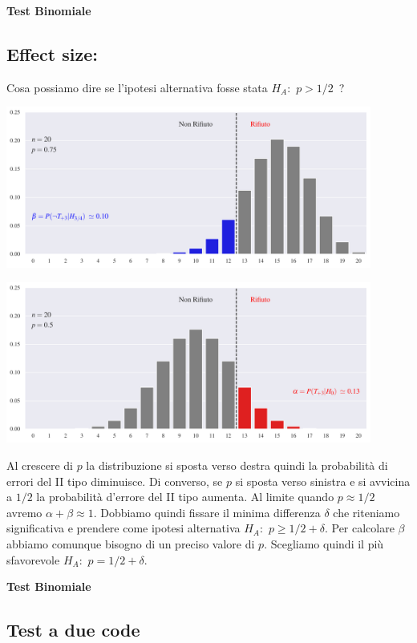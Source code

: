 \documentclass[11pt,openany]{book}
\begin{document}
\clearpage\hfill\textbf{Test Binomiale}\subsection{Effect size: \boldmath{$\delta$}}


Cosa possiamo dire se l'ipotesi alternativa fosse stata $H_A:$ $p>1/2$~?

\hfil\includegraphics[width=0.9\textwidth]{figure/B-test_02.pdf}

\hfil\includegraphics[width=0.9\textwidth]{figure/B-test_01.pdf}

Al crescere di $p$ la distribuzione si sposta verso destra quindi la probabilità di errori del II tipo diminuisce. 
Di converso, se $p$ si sposta verso sinistra e si avvicina a $1/2$  la probabilità d'errore del II tipo aumenta. Al limite quando $p\approx 1/2$ avremo $\alpha+\beta\approx 1$. 
Dobbiamo quindi fissare il minima differenza $\delta$ che riteniamo significativa e prendere come ipotesi alternativa  $H_A:$ $p\ge1/2+\delta$.
Per calcolare $\beta$ abbiamo comunque bisogno di un preciso valore di $p$.
Scegliamo quindi il più sfavorevole $H_A:$ $p=1/2+\delta$.




\clearpage\hfill\textbf{Test Binomiale}\subsection{Test a due code}
\end{document}
